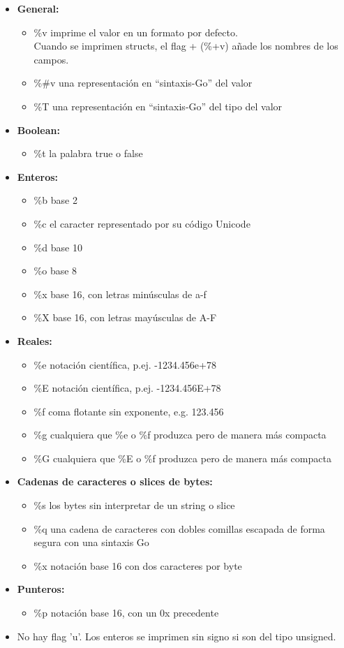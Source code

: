 		\begin{itemize} \item \textbf{General:} \begin{itemize} \item \%v
		imprime el valor en un formato por defecto.\\ Cuando se imprimen
		structs, el flag + (\%+v) añade los nombres de los campos.  \item \%\#v
		una representación en ``sintaxis-Go'' del valor \item \%T  una
		representación en ``sintaxis-Go'' del tipo del valor \end{itemize} \item
		\textbf{Boolean:} \begin{itemize} \item \%t  la palabra true o false
		\end{itemize} \item \textbf{Enteros:} \begin{itemize} \item \%b	base
		2 \item \%c	el caracter representado por su código Unicode \item \%d
		base 10 \item \%o	base 8 \item \%x	base 16, con letras minúsculas
		de a-f \item \%X	base 16, con letras mayúsculas de A-F \end{itemize}
		\item \textbf{Reales:} \begin{itemize} \item \%e  notación científica,
		p.ej. -1234.456e+78 \item \%E  notación científica, p.ej. -1234.456E+78
		\item \%f  coma flotante sin exponente, e.g. 123.456 \item \%g
		cualquiera que \%e o \%f produzca pero de manera más compacta \item \%G
		cualquiera que \%E o \%f produzca pero de manera más compacta
		\end{itemize} \item \textbf{Cadenas de caracteres o slices de bytes:}
		\begin{itemize} \item \%s  los bytes sin interpretar de un string
		o slice \item \%q  una cadena de caracteres con dobles comillas escapada
		de forma segura con una sintaxis Go \item \%x  notación base 16 con dos
		caracteres por byte \end{itemize} \item \textbf{Punteros:}
		\begin{itemize} \item \%p	notación base 16, con un 0x precedente
		\end{itemize}

			\item No hay flag 'u'. Los enteros se imprimen sin signo si son del
			tipo unsigned.  \end{itemize}
	
